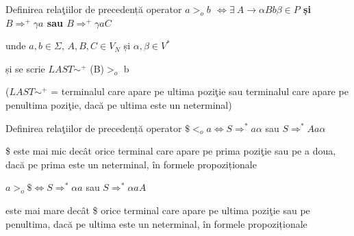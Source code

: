 \documentclass[pdf]{beamer}
\begin{document}
\begin{frame}{Definirea relaţiilor de precedență operator}
\textbf{$a >_{o} b$ $\Leftrightarrow \exists \  A \rightarrow \alpha B b\beta \in P$ și $B \Rightarrow^{+} \gamma a$ sau $B \Rightarrow^{+} \gamma a C$}
\newline

unde $a,b \in \Sigma$, $A,B,C \in V_N$ și $\alpha, \beta \in V^*$

și se scrie $LAST\sim^+$ (B)$ >_{o}$ b
\newline

($LAST\sim^+$  =  terminalul care apare pe ultima poziţie sau terminalul care apare pe penultima poziţie, dacă pe ultima este un neterminal)

\begin{figure}[!htb]
\begin{minipage}{0.48\textwidth}
\centering
\end{minipage}\hfill
\begin{minipage}{0.48\textwidth}
\centering
\end{minipage}\hfill
\end{figure}
\end{frame}



\begin{frame}{Definirea relaţiilor de precedență operator}
$ \$ <_o a \Leftrightarrow S \Rightarrow^*  a \alpha$ sau $S \Rightarrow^* A a \alpha$
\newline


\$ este mai mic decât orice terminal care apare pe prima poziţie sau pe a doua, dacă pe prima este un neterminal, în formele propoziționale
\newline

$ a >_o \$ \Leftrightarrow S \Rightarrow^*  \alpha a$ sau $ S \Rightarrow^* \alpha a A$
\newline 

este mai mare decât \$ orice terminal care apare pe ultima poziţie sau pe penultima, dacă pe ultima este un neterminal, în formele propoziționale
\end{frame}
\end{document}

